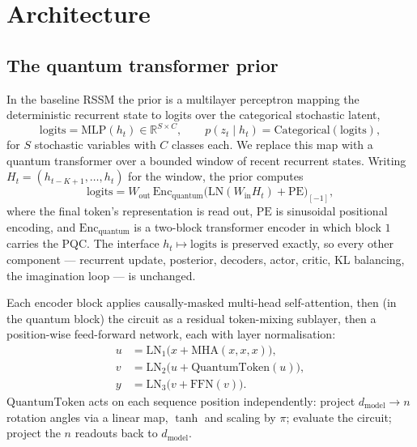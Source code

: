 \documentclass[11pt]{article}
\begin{document}
\section{Architecture}\label{sec:arch}
\subsection{The quantum transformer prior}
In the baseline RSSM the prior is a multilayer perceptron mapping the
deterministic recurrent state to logits over the categorical stochastic
latent,
\[
  \text{logits} = \mathrm{MLP}(h_t) \in \mathbb{R}^{S \times C},
  \qquad p(z_t \mid h_t) = \mathrm{Categorical}(\text{logits}),
\]
for $S$ stochastic variables with $C$ classes each. We replace this map
with a quantum transformer over a bounded window of recent recurrent
states. Writing $H_t = (h_{t-K+1}, \dots, h_t)$ for the window, the
prior computes
\[
  \text{logits} = W_{\text{out}}\,
    \mathrm{Enc}_{\text{quantum}}\!\big(\mathrm{LN}(W_{\text{in}} H_t)
      + \mathrm{PE}\big)_{[-1]},
\]
where the final token's representation is read out, $\mathrm{PE}$ is
sinusoidal positional encoding, and $\mathrm{Enc}_{\text{quantum}}$ is a
two-block transformer encoder in which block $1$ carries the PQC. The
interface $h_t \mapsto \text{logits}$ is preserved exactly, so every
other component --- recurrent update, posterior, decoders, actor,
critic, KL balancing, the imagination loop --- is unchanged.

Each encoder block applies causally-masked multi-head self-attention,
then (in the quantum block) the circuit as a residual token-mixing
sublayer, then a position-wise feed-forward network, each with layer
normalisation:
\begin{align*}
  u &= \mathrm{LN}_1\big(x + \mathrm{MHA}(x, x, x)\big), \\
  v &= \mathrm{LN}_2\big(u + \mathrm{QuantumToken}(u)\big), \\
  y &= \mathrm{LN}_3\big(v + \mathrm{FFN}(v)\big).
\end{align*}
$\mathrm{QuantumToken}$ acts on each sequence position independently:
project $d_{\text{model}} \to n$ rotation angles via a linear map,
$\tanh$ and scaling by $\pi$; evaluate the circuit; project the
$n$ readouts back to $d_{\text{model}}$.
\end{document}
